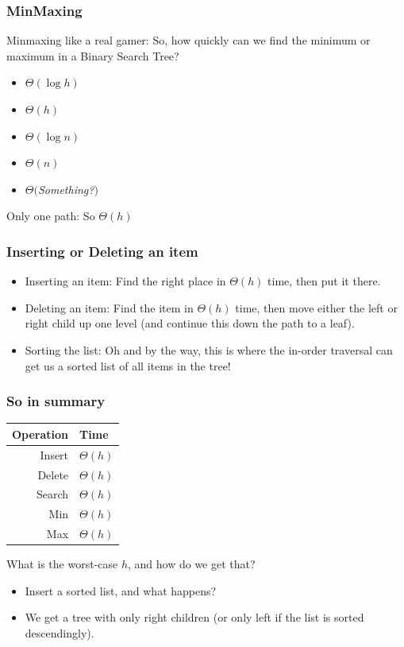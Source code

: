 \begin{frame}
	\frametitle{MinMaxing}
	
Minmaxing like a real gamer:	So, how quickly can we find the minimum or maximum in a Binary Search Tree?
			\begin{itemize}
				\item $\Theta(\log h)$
				\item $\Theta(h)$
				\item $\Theta(\log n)$
				\item $\Theta(n)$
				\item $\Theta($\textit{Something?}$)$
			\end{itemize}

		Only one path:	So $\Theta(h)$

		
	
\end{frame}

\begin{frame}
	\frametitle{Inserting or Deleting an item}

			\begin{itemize}
				\item Inserting an item:	Find the right place in $\Theta(h)$ time, then put it there.
				\item Deleting an item:	Find the item in $\Theta(h)$ time, then move either the left or right child up one level (and continue this down the
		path to a leaf).
				\item Sorting the list:		Oh and by the way, this is where the in-order traversal can get us a sorted list of all items in the tree!
		\end{itemize}	
\end{frame}

\begin{frame}
	\frametitle{So in summary}
	\begin{tabular}{r | l}
		Operation & Time \\
		\midrule
		Insert & $\Theta(h)$ \\
		Delete & $\Theta(h)$ \\
		Search & $\Theta(h)$ \\
		Min & $\Theta(h)$ \\
		Max & $\Theta(h)$ \\
	\end{tabular}
		
		What is the worst-case $h$, and how do we get that?
	
			\begin{itemize}
				\item Insert a sorted list, and what happens? \\
		 				\item We get a tree with only right children (or only left if the list is sorted descendingly).
	\end{itemize}
	
\end{frame}

